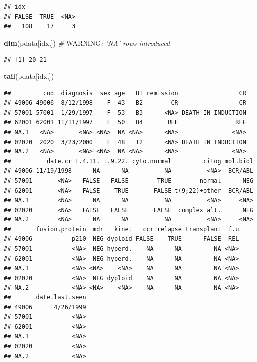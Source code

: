 \documentclass[]{article}
\newenvironment{Shaded}{\begin{snugshade}}{\end{snugshade}}
\newcommand{\KeywordTok}[1]{\textcolor[rgb]{0.13,0.29,0.53}{\textbf{#1}}}
\newcommand{\CommentTok}[1]{\textcolor[rgb]{0.56,0.35,0.01}{\textit{#1}}}
\newcommand{\AlertTok}[1]{\textcolor[rgb]{0.94,0.16,0.16}{#1}}
\newcommand{\NormalTok}[1]{#1}
\theoremstyle{definition}
\theoremstyle{definition}
\theoremstyle{remark}
\begin{document}
\begin{verbatim}
## idx
## FALSE  TRUE  <NA> 
##   108    17     3
\end{verbatim}

\begin{Shaded}
\begin{Highlighting}[]
\KeywordTok{dim}\NormalTok{(pdata[idx,])           }\CommentTok{# }\AlertTok{WARNING}\CommentTok{: 'NA' rows introduced}
\end{Highlighting}
\end{Shaded}

\begin{verbatim}
## [1] 20 21
\end{verbatim}

\begin{Shaded}
\begin{Highlighting}[]
\KeywordTok{tail}\NormalTok{(pdata[idx,])}
\end{Highlighting}
\end{Shaded}

\begin{verbatim}
##         cod  diagnosis  sex age   BT remission                 CR
## 49006 49006  8/12/1998    F  43   B2        CR                 CR
## 57001 57001  1/29/1997    F  53   B3      <NA> DEATH IN INDUCTION
## 62001 62001 11/11/1997    F  50   B4       REF                REF
## NA.1   <NA>       <NA> <NA>  NA <NA>      <NA>               <NA>
## 02020  2020  3/23/2000    F  48   T2      <NA> DEATH IN INDUCTION
## NA.2   <NA>       <NA> <NA>  NA <NA>      <NA>               <NA>
##          date.cr t.4.11. t.9.22. cyto.normal         citog mol.biol
## 49006 11/19/1998      NA      NA          NA          <NA>  BCR/ABL
## 57001       <NA>   FALSE   FALSE        TRUE        normal      NEG
## 62001       <NA>   FALSE    TRUE       FALSE t(9;22)+other  BCR/ABL
## NA.1        <NA>      NA      NA          NA          <NA>     <NA>
## 02020       <NA>   FALSE   FALSE       FALSE  complex alt.      NEG
## NA.2        <NA>      NA      NA          NA          <NA>     <NA>
##       fusion.protein  mdr   kinet   ccr relapse transplant  f.u
## 49006           p210  NEG dyploid FALSE    TRUE      FALSE  REL
## 57001           <NA>  NEG hyperd.    NA      NA         NA <NA>
## 62001           <NA>  NEG hyperd.    NA      NA         NA <NA>
## NA.1            <NA> <NA>    <NA>    NA      NA         NA <NA>
## 02020           <NA>  NEG dyploid    NA      NA         NA <NA>
## NA.2            <NA> <NA>    <NA>    NA      NA         NA <NA>
##       date.last.seen
## 49006      4/26/1999
## 57001           <NA>
## 62001           <NA>
## NA.1            <NA>
## 02020           <NA>
## NA.2            <NA>
\end{verbatim}
\end{document}
